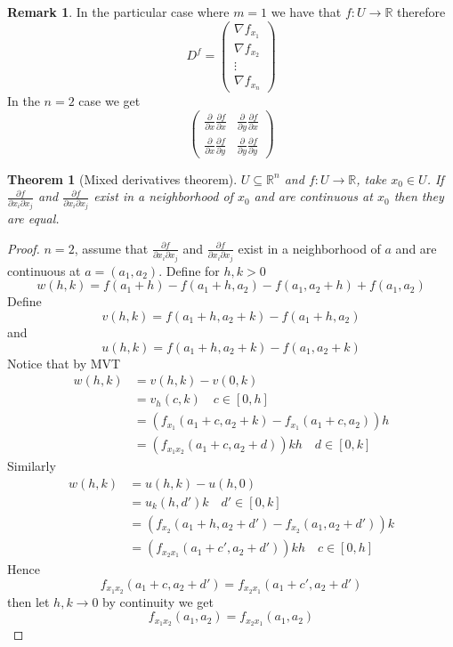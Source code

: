 \documentclass[11pt,a4paper]{article}
\theoremstyle{definition}
\newtheorem{remark}[definition]{Remark}
\theoremstyle{plain}
\newtheorem{theorem}[definition]{Theorem}
\theoremstyle{remark}
\newcommand{\R}{\mathbb{R}}
\begin{document}
\begin{remark}
    In the particular case where $m =1 $ we have that $f \colon U \to \R$ therefore 
    $$D^f = \begin{pmatrix}
        \nabla f_{x_1} \\
        \nabla f_{x_2} \\
        \vdots \\
        \nabla f_{x_n} 
    \end{pmatrix}$$
    In the $n=2$ case we get 
    $$\begin{pmatrix}
        \frac{\partial }{\partial x} \frac{\partial f}{\partial x} & \frac{\partial }{\partial y} \frac{\partial f}{\partial x} \\
        \frac{\partial }{\partial x} \frac{\partial f}{\partial y} & \frac{\partial }{\partial y} \frac{\partial f}{\partial y}
    \end{pmatrix}$$
\end{remark}


\begin{theorem}[Mixed derivatives theorem]
    $U \subseteq \R^n$ and $f \colon U \to \R$, take $x_0 \in U$. If $\frac{\partial f}{\partial x_i \partial x_j}$ and 
    $\frac{\partial f}{\partial x_i \partial x_j}$ exist in a neighborhood of $x_0$ and are continuous at $x_0$ then they are equal. 
\end{theorem}

\begin{proof}
    $n = 2$, assume that $\frac{\partial f}{\partial x_i \partial x_j}$ and 
    $\frac{\partial f}{\partial x_i \partial x_j}$ exist in a neighborhood of $a$ and are continuous at $a = (a_1, a_2)$. Define for $h,k > 0$ 
    $$w(h,k) = f(a_1 + h) - f(a_1 + h, a_2) - f(a_1, a_2 + h) + f(a_1, a_2)$$
    Define 
    $$v(h,k) = f(a_1 + h, a_2 + k) - f(a_1 + h, a_2)$$
    and 
    $$u(h,k) = f(a_1 + h, a_2 + k)  - f(a_1, a_2 + k)$$
    Notice that by MVT 
    \begin{align*}
        w(h,k) &= v(h,k) - v(0,k) \\
        &= v_h(c,k) \quad c \in [0,h] \\
        &= \left(f_{x_1} (a_1 + c, a_2 + k) - f_{x_1} (a_1 + c, a_2) \right) h\\
        &= \left(f_{x_1 x_2} (a_1 + c, a_2 + d)\right) kh \quad d \in [0,k]
    \end{align*}
    Similarly 
    \begin{align*}
        w(h,k) &= u(h,k) - u(h,0) \\
        &= u_k(h,d') k \quad d' \in [0,k] \\
        &= \left(f_{x_2} (a_1 + h, a_2 + d') - f_{x_2} (a_1, a_2 + d')\right)k \\
        &= \left(f_{x_2 x_1} (a_1 + c', a_2 + d')\right) kh \quad c \in [0,h]
    \end{align*}
    Hence 
    $$f_{x_1 x_2} (a_1 + c, a_2 + d') = f_{x_2 x_1} (a_1 + c', a_2 + d')$$
    then let $h,k \to 0$ by continuity we get 
    $$f_{x_1 x_2} (a_1, a_2) = f_{x_2x_1} (a_1, a_2)$$
\end{proof}
\end{document}
